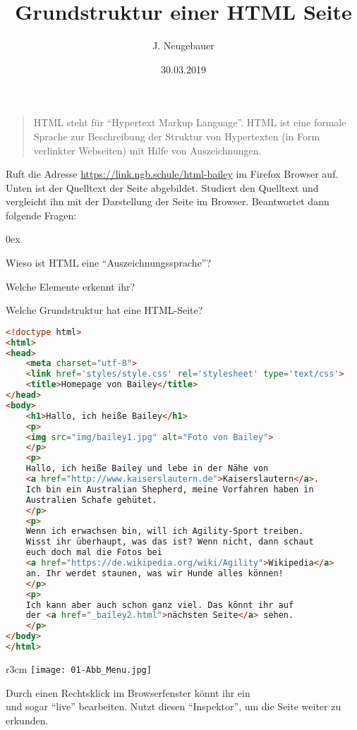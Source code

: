 \documentclass[a4paper,11pt]{scrartcl}
\author{J. Neugebauer}
\title{Grundstruktur einer HTML Seite}
\date{30.03.2019}
\begin{document}
\ReiheTitel

\begin{quote}
HTML steht für \enquote{Hypertext Markup Language}. HTML ist eine formale Sprache zur Beschreibung der Struktur von Hypertexten (in Form verlinkter Webseiten) mit Hilfe von Auszeichnungen.
\end{quote}

\begin{aufgabe}[symbol=\Large\symLaptop]
Ruft die Adresse \url{https://link.ngb.schule/html-bailey} im Firefox Browser auf. Unten ist der Quelltext der Seite abgebildet. Studiert den Quelltext und vergleicht ihn mit der Darstellung der Seite im Browser. Beantwortet dann folgende Fragen:
\begin{enumeratea}\itemsep 0ex
	\item Wieso ist HTML eine \enquote{Auszeichnungssprache}?
	\item Welche Elemente erkennt ihr?
	\item Welche Grundstruktur hat eine HTML-Seite?
\end{enumeratea}
\begin{lstlisting}[language=HTML,basicstyle=\scriptsize\ttfamily]
<!doctype html>
<html>
<head>
	<meta charset="utf-8">
	<link href='styles/style.css' rel='stylesheet' type='text/css'>
	<title>Homepage von Bailey</title>
</head>
<body>
	<h1>Hallo, ich heiße Bailey</h1>
	<p>
	<img src="img/bailey1.jpg" alt="Foto von Bailey">
	</p>
	<p>
	Hallo, ich heiße Bailey und lebe in der Nähe von 
	<a href="http://www.kaiserslautern.de">Kaiserslautern</a>. 
	Ich bin ein Australian Shepherd, meine Vorfahren haben in 
	Australien Schafe gehütet.
	</p>
	<p>
	Wenn ich erwachsen bin, will ich Agility-Sport treiben. 
	Wisst ihr überhaupt, was das ist? Wenn nicht, dann schaut 
	euch doch mal die Fotos bei 
	<a href="https://de.wikipedia.org/wiki/Agility">Wikipedia</a> 
	an. Ihr werdet staunen, was wir Hunde alles können!
	</p>
	<p>
	Ich kann aber auch schon ganz viel. Das könnt ihr auf 
	der <a href="_bailey2.html">nächsten Seite</a> sehen.
	</p>
</body>
</html>
\end{lstlisting}
\end{aufgabe}

\begin{wrapfigure}{r}{3cm}
	\texttt{[image: 01-Abb\_Menu.jpg]}
\end{wrapfigure}
\begin{aufgabe}[symbol=\Large\symLaptop]
	Durch einen Rechtsklick im Browserfenster könnt ihr ein \\
	 und sogar \enquote{live} bearbeiten. Nutzt diesen \enquote{Inspektor}, um die Seite weiter zu \\
	 erkunden.
\end{aufgabe}
\end{document}

